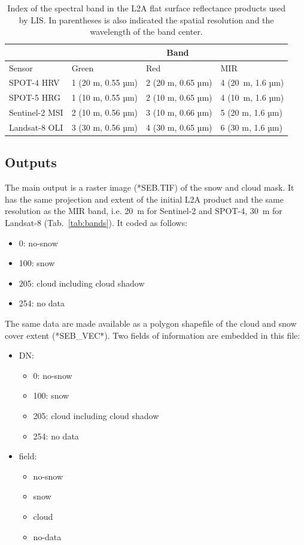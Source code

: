 \documentclass[a4paper]{article}
\begin{document}
\begin{table}[h]
\begin{center}
\begin{tabular}{|l|lll|}
\hline
  & \multicolumn{3}{|c|}{Band}\\
\hline
Sensor & Green & Red & MIR\\
\hline
SPOT-4 HRV & 1 (20 m, 0.55 µm) & 2 (20 m, 0.65 µm) & 4 (20~m, 1.6 µm)\\
SPOT-5 HRG & 1 (10 m, 0.55 µm) & 2 (10 m, 0.65 µm) & 4 (10~m, 1.6 µm)\\
Sentinel-2 MSI & 2 (10 m, 0.56 µm) & 3 (10 m, 0.66 µm) & 5 (20 m, 1.6 µm)\\
Landsat-8 OLI & 3 (30 m, 0.56 µm) & 4 (30 m, 0.65 µm) & 6 (30 m, 1.6 µm)\\
\hline
\end{tabular}
\end{center}
\caption{Index of the spectral band in the L2A flat surface reflectance products used by LIS. In parentheses is also indicated the spatial resolution and the wavelength of the band center.}
\end{table}\label{tab:bands}

\subsection{Outputs}\label{par:outputs}

The main output is a raster image (*SEB.TIF) of the snow and cloud mask. It has the same projection and extent of the initial L2A product and the same resolution as the MIR band, i.e. 20~m for Sentinel-2 and SPOT-4, 30~m for Landsat-8 (Tab.~\ref{tab:bands}). It coded as follows:
\begin{itemize}
 \item 0: no-snow
 \item 100: snow
 \item 205: cloud including cloud shadow
 \item 254: no data
\end{itemize}

The same data are made available as a polygon shapefile of the cloud and snow cover extent (*SEB\_VEC*). Two fields of information are embedded in this file:
\begin{itemize}
  \item DN:
  \begin{itemize}
    \item 0: no-snow
    \item 100: snow
    \item 205: cloud including cloud shadow
    \item 254: no data
  \end{itemize}
  \item field:
  \begin{itemize}
    \item no-snow
    \item snow
    \item cloud
    \item no-data
  \end{itemize}
\end{itemize}
\end{document}
